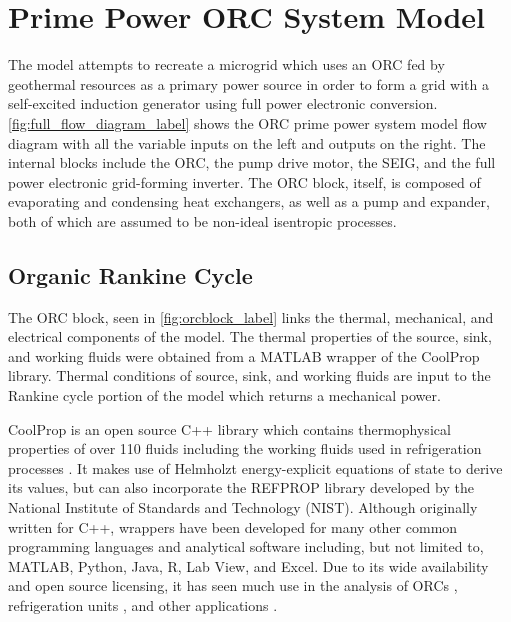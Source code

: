 \chapter{Prime Power ORC System Model}
\label{ch:model}

The model attempts to recreate a microgrid which uses an ORC fed by geothermal resources as a primary power source in order to form a grid with a self-excited induction generator using full power electronic conversion. \autoref{fig:full_flow_diagram_label} shows the ORC prime power system model flow diagram with all the variable inputs on the left and outputs on the right. The internal blocks include the ORC, the pump drive motor, the SEIG, and the full power electronic grid-forming inverter. The ORC block, itself, is composed of evaporating and condensing heat exchangers, as well as a pump and expander, both of which are assumed to be non-ideal isentropic processes.


\section{Organic Rankine Cycle}
The ORC block, seen in \autoref{fig:orcblock_label} links the thermal, mechanical, and electrical components of the model. The thermal properties of the source, sink, and working fluids were obtained from a MATLAB wrapper of the CoolProp library. Thermal conditions of source, sink, and working fluids are input to the Rankine cycle portion of the model which returns a mechanical power. 


CoolProp is an open source C++ library which contains thermophysical properties of over 110 fluids including the working fluids used in refrigeration processes \cite{Bell2014}. It makes use of Helmholzt energy-explicit equations of state to derive its values, but can also incorporate the REFPROP library developed by the National Institute of Standards and Technology (NIST). Although originally written for C++, wrappers have been developed for many other common programming languages and analytical software including, but not limited to, MATLAB, Python, Java, R, Lab View, and Excel. Due to its wide availability and open source licensing, it has seen much use in the analysis of ORCs \cite{Pezzuolo2016, Pierobon2014}, refrigeration units \cite{Besagni2015}, and other applications \cite{Quoilin2014, Nilsen2016}.

